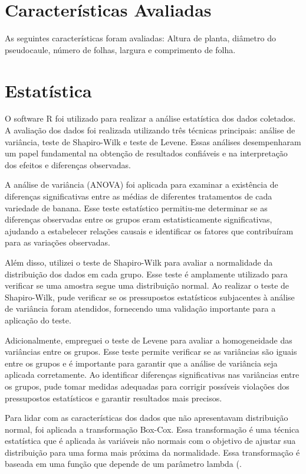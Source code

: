 \section{Características Avaliadas}
As seguintes características foram avaliadas: Altura de planta, diâmetro do pseudocaule, número de folhas, largura e comprimento de folha.

\section{Estatística}
O software R foi utilizado para realizar a análise estatística dos dados coletados. A avaliação dos dados foi realizada utilizando três técnicas principais: análise de variância, teste de Shapiro-Wilk e teste de Levene. Essas análises desempenharam um papel fundamental na obtenção de resultados confiáveis e na interpretação dos efeitos e diferenças observadas.

A análise de variância (ANOVA) foi aplicada para examinar a existência de diferenças significativas entre as médias de diferentes tratamentos de cada variedade de banana. Esse teste estatístico permitiu-me determinar se as diferenças observadas entre os grupos eram estatisticamente significativas, ajudando a estabelecer relações causais e identificar os fatores que contribuíram para as variações observadas.

Além disso, utilizei o teste de Shapiro-Wilk para avaliar a normalidade da distribuição dos dados em cada grupo. Esse teste é amplamente utilizado para verificar se uma amostra segue uma distribuição normal. Ao realizar o teste de Shapiro-Wilk, pude verificar se os pressupostos estatísticos subjacentes à análise de variância foram atendidos, fornecendo uma validação importante para a aplicação do teste.

Adicionalmente, empreguei o teste de Levene para avaliar a homogeneidade das variâncias entre os grupos. Esse teste permite verificar se as variâncias são iguais entre os grupos e é importante para garantir que a análise de variância seja aplicada corretamente. Ao identificar diferenças significativas nas variâncias entre os grupos, pude tomar medidas adequadas para corrigir possíveis violações dos pressupostos estatísticos e garantir resultados mais precisos.

Para lidar com as características dos dados que não apresentavam distribuição normal, foi aplicada a transformação Box-Cox. Essa transformação é uma técnica estatística que é aplicada às variáveis não normais com o objetivo de ajustar sua distribuição para uma forma mais próxima da normalidade. Essa transformação é baseada em uma função que depende de um parâmetro lambda (\λ\).